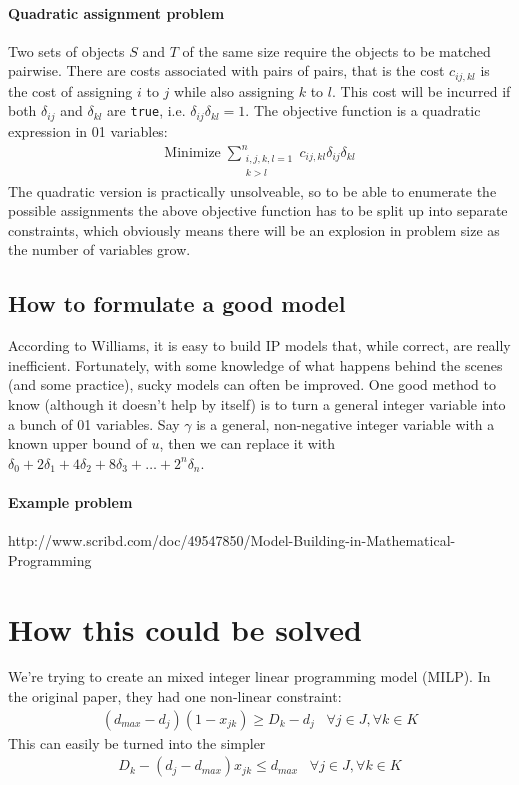 \documentclass[13pt, letterpaper, twoside]{book}
\begin{document}
\paragraph*{Quadratic assignment problem} Two sets of objects $S$ and $T$ of the same size require the objects to be matched pairwise. There are costs associated with pairs of pairs, that is the cost $c_{ij,kl}$ is the cost of assigning $i$ to $j$ while also assigning $k$ to $l$. This cost will be incurred if both $\delta_{ij}$ and $\delta_{kl}$ are \texttt{true}, i.e. $\delta_{ij}\delta_{kl} = 1$. The objective function is a quadratic expression in 01 variables:
\begin{align}
\mathrm{Minimize}\;\sum^n_{\substack{i,j,k,l=1\\k>l}} c_{ij,kl}\delta_{ij}\delta_{kl}
\end{align}
The quadratic version is practically unsolveable, so to be able to enumerate the possible assignments the above objective function has to be split up into separate constraints, which obviously means there will be an explosion in problem size as the number of variables grow.

\subsection{How to formulate a good model}
According to Williams, it is easy to build IP models that, while correct, are really inefficient. Fortunately, with some knowledge of what happens behind the scenes (and some practice), sucky models can often be improved. One good method to know (although it doesn't help by itself) is to turn a general integer variable into a bunch of 01 variables. Say $\gamma$ is a general, non-negative integer variable with a known upper bound of $u$, then we can replace it with $\delta_0 + 2\delta_1 + 4\delta_2 + 8\delta_3 + \dots + 2^n\delta_n$. 

\paragraph*{Example problem} 
http://www.scribd.com/doc/49547850/Model-Building-in-Mathematical-Programming

\pagebreak
\section{How this could be solved}
We're trying to create an mixed integer linear programming model (MILP). In the original paper, they had one non-linear constraint:
\begin{align}
  (d_{max}-d_j)(1-x_{jk}) \geq D_k-d_j \;\;\;\forall j \in J, \forall k \in K
\end{align}
This can easily be turned into the simpler
\begin{align}
  D_k - (d_j - d_{max})x_{jk} \leq d_{max} \;\;\;\forall j \in J, \forall k \in K
\end{align}
\end{document}
